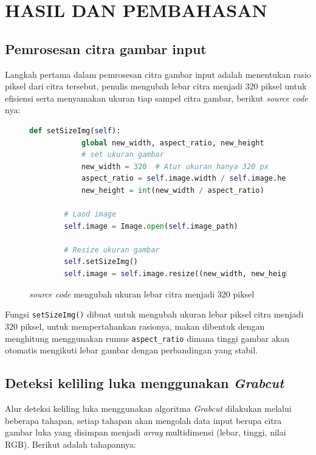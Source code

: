 
\chapter{HASIL DAN PEMBAHASAN}

\section{Pemrosesan citra gambar input}
Langkah pertama dalam pemrosesan citra gambar input adalah menentukan rasio piksel 
dari citra tersebut, penulis mengubah lebar citra menjadi 320 piksel untuk efisiensi 
serta menyamakan ukuran tiap sampel citra gambar, berikut \emph{source code} nya:

\begin{figure}[H]
	\begin{lstlisting}[language=Python, basicstyle=\tiny]
		def setSizeImg(self):
			global new_width, aspect_ratio, new_height
			# set ukuran gambar
			new_width = 320  # Atur ukuran hanya 320 px
			aspect_ratio = self.image.width / self.image.height
			new_height = int(new_width / aspect_ratio)
		
		# Laod image
		self.image = Image.open(self.image_path)

		# Resize ukuran gambar
		self.setSizeImg() 
		self.image = self.image.resize((new_width, new_height)) 
	\end{lstlisting}
	\caption{\emph{source code} mengubah ukuran lebar citra menjadi 320 piksel}
	\label{code:resize_gambar}
\end{figure}

Fungsi \texttt{setSizeImg()} dibuat untuk mengubah ukuran lebar piksel citra 
menjadi 320 piksel, untuk mempertahankan rasionya, makan dibentuk dengan menghitung
menggunakan rumus \texttt{aspect\_ratio} dimana tinggi gambar akan otomatis mengikuti lebar gambar 
dengan perbandingan yang stabil.

\section{Deteksi keliling luka menggunakan \emph{Grabcut}}
Alur deteksi keliling luka menggunakan algoritma \emph{Grabcut} dilakukan melalui
beberapa tahapan, setiap tahapan akan mengolah data input berupa citra gambar luka 
yang disimpan menjadi \emph{array} multidimensi (lebar, tinggi, nilai RGB).
Berikut adalah tahapannya:

